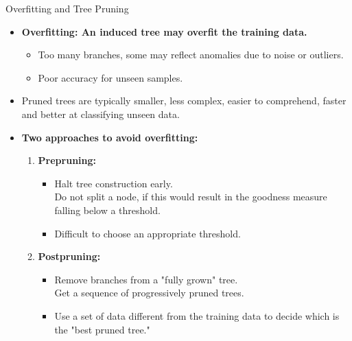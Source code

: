 \begin{frame}{Overfitting and Tree Pruning}
	\begin{itemize}
		\item \textbf{Overfitting: An induced tree may overfit the training data.}
		      \begin{itemize}
			      \item Too many branches, some may reflect anomalies due to noise or outliers.
			      \item Poor accuracy for unseen samples.
		      \end{itemize}
		\item Pruned trees are typically smaller, less complex, easier to
		      comprehend, faster and better at classifying unseen data.
		\item \textbf{Two approaches to avoid overfitting:}
		      \begin{enumerate}
			      \item \textbf{\color{airforceblue}Prepruning:}
			            \begin{itemize}
				            \item Halt tree construction early.\\
				                  Do not split a node, if this would result in the goodness measure falling below a threshold.
				            \item Difficult to choose an appropriate threshold.
			            \end{itemize}
			      \item \textbf{\color{airforceblue}Postpruning:}
			            \begin{itemize}
				            \item Remove branches from a "fully grown" tree.\\
				                  Get a sequence of progressively pruned trees.
				            \item Use a set of data different from the training data to decide which is the "best pruned tree."
			            \end{itemize}
		      \end{enumerate}
	\end{itemize}
\end{frame}

